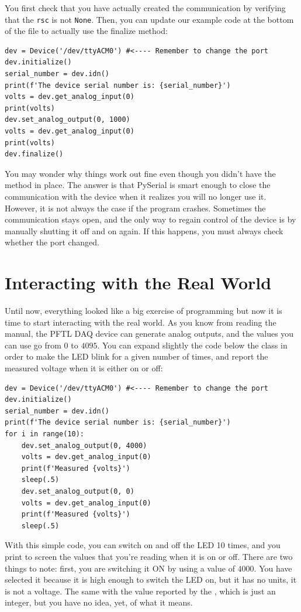 You first check that you have actually created the communication by verifying that the \texttt{rsc} is not \texttt{None}. Then, you can update our example code at the bottom of the file to actually use the finalize method:

\begin{verbatim}
dev = Device('/dev/ttyACM0') #<---- Remember to change the port
dev.initialize()
serial_number = dev.idn()
print(f'The device serial number is: {serial_number}')
volts = dev.get_analog_input(0)
print(volts)
dev.set_analog_output(0, 1000)
volts = dev.get_analog_input(0)
print(volts)
dev.finalize()
\end{verbatim}

You may wonder why things work out fine even though you didn't have the  method in place. The answer is that PySerial is smart enough to close the communication with the device when it realizes you will no longer use it. However, it is not always the case if the program crashes. Sometimes the communication stays open, and the only way to regain control of the device is by manually shutting it off and on again. If this happens, you must always check whether the port changed.

\section{Interacting with the Real World}\label{sec:doing-something-in-theemph}
Until now, everything looked like a big exercise of programming but now it is time to start interacting with the real world. As you know from reading the manual, the {PFTL DAQ} device can generate analog outputs, and the values you can use go from $0$ to $4095$. You can expand slightly the code below the class in order to make the LED blink for a given number of times, and report the measured voltage when it is either on or off:

\begin{verbatim}
dev = Device('/dev/ttyACM0') #<---- Remember to change the port
dev.initialize()
serial_number = dev.idn()
print(f'The device serial number is: {serial_number}')
for i in range(10):
    dev.set_analog_output(0, 4000)
    volts = dev.get_analog_input(0)
    print(f'Measured {volts}')
    sleep(.5)
    dev.set_analog_output(0, 0)
    volts = dev.get_analog_input(0)
    print(f'Measured {volts}')
    sleep(.5)
\end{verbatim}

With this simple code, you can switch on and off the LED 10 times, and you print to screen the values that you're reading when it is on or off. There are two things to note: first, you are switching it ON by using a value of $4000$. You have selected it because it is high enough to switch the LED on, but it has no units, it is not a voltage. The same with the value reported by the , which is just an integer, but you have no idea, yet, of what it means.

